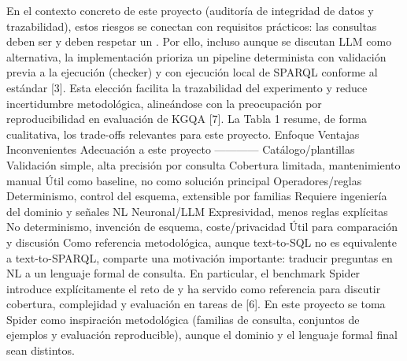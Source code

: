 {}En el contexto concreto de este proyecto (auditoría de integridad de datos y trazabilidad), estos riesgos se conectan con requisitos prácticos: las consultas deben ser  y deben respetar un . Por ello, incluso aunque se discutan LLM como alternativa, la implementación prioriza un pipeline determinista con validación previa a la ejecución (checker) y con ejecución local de SPARQL conforme al estándar [3]. Esta elección facilita la trazabilidad del experimento y reduce incertidumbre metodológica, alineándose con la preocupación por reproducibilidad en evaluación de KGQA [7].\markdownRendererInterblockSeparator
{}La Tabla 1 resume, de forma cualitativa, los trade-offs relevantes para este proyecto.\markdownRendererInterblockSeparator
{}\markdownRendererPipe{} Enfoque \markdownRendererPipe{} Ventajas \markdownRendererPipe{} Inconvenientes \markdownRendererPipe{} Adecuación a este proyecto \markdownRendererPipe{} \markdownRendererPipe{}---\markdownRendererPipe{}---\markdownRendererPipe{}---\markdownRendererPipe{}---\markdownRendererPipe{} \markdownRendererPipe{} Catálogo/plantillas \markdownRendererPipe{} Validación simple, alta precisión por consulta \markdownRendererPipe{} Cobertura limitada, mantenimiento manual \markdownRendererPipe{} Útil como baseline, no como solución principal \markdownRendererPipe{} \markdownRendererPipe{} Operadores/reglas \markdownRendererPipe{} Determinismo, control del esquema, extensible por familias \markdownRendererPipe{} Requiere ingeniería del dominio y señales NL \markdownRendererPipe{}  \markdownRendererPipe{} \markdownRendererPipe{} Neuronal/LLM \markdownRendererPipe{} Expresividad, menos reglas explícitas \markdownRendererPipe{} No determinismo, invención de esquema, coste/privacidad \markdownRendererPipe{} Útil para comparación y discusión \markdownRendererPipe{}\markdownRendererInterblockSeparator
{}\markdownRendererInterblockSeparator
{}Como referencia metodológica, aunque text-to-SQL no es equivalente a text-to-SPARQL, comparte una motivación importante: traducir preguntas en NL a un lenguaje formal de consulta. En particular, el benchmark Spider introduce explícitamente el reto de  y ha servido como referencia para discutir cobertura, complejidad y evaluación en tareas de  [6]. En este proyecto se toma Spider como inspiración metodológica (familias de consulta, conjuntos de ejemplos y evaluación reproducible), aunque el dominio y el lenguaje formal final sean distintos.\markdownRendererInterblockSeparator

